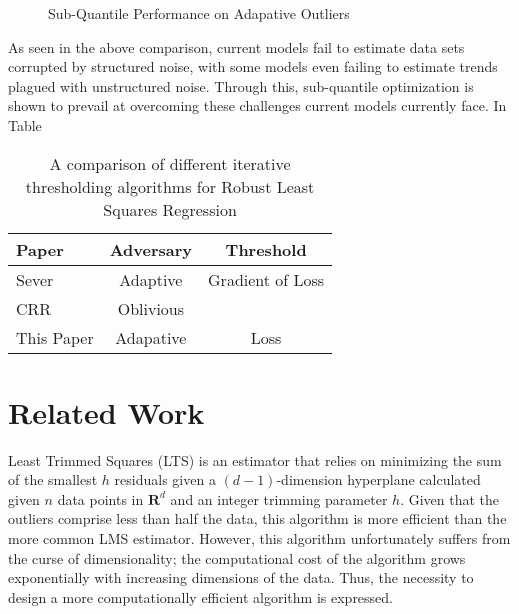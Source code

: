 \documentclass{article} %
\begin{document}
\begin{figure}[!t]
		\caption{Sub-Quantile Performance on Adapative Outliers}
		\label{fig:structure-unstructured-noise}
	\end{figure}
	
	As seen in the above comparison, current models fail to estimate data sets corrupted by structured noise, with some models even failing to estimate trends plagued with unstructured noise. Through this, sub-quantile optimization is shown to prevail at overcoming these challenges current models currently face. In Table 
	
	\begin{table}[!h]
		\centering
		\begin{tabular}{lcc}
			\toprule 
			Paper & Adversary & Threshold\\   
			\midrule                
			Sever \cite{DiakonikolasKKLSS19} & Adaptive & Gradient of Loss \\
			\midrule
			CRR \cite{bhatia2017} & Oblivious & \\
			\midrule 
			This Paper & Adapative & Loss\\
			\bottomrule
		\end{tabular}
		\caption{A comparison of different iterative thresholding algorithms for Robust Least Squares Regression}
		\label{tab:related-work}
	\end{table}
	
	\section{Related Work}
	Least Trimmed Squares (LTS) \cite{LTS} is an estimator that relies on minimizing the sum of the smallest $h$ residuals given a $(d-1)$-dimension hyperplane calculated given $n$ data points in $\mathbf{R}^d$ and an integer trimming parameter $h$. Given that the outliers comprise less than half the data, this algorithm is more efficient than the more common LMS estimator. However, this algorithm unfortunately suffers from the curse of dimensionality; the computational cost of the algorithm grows exponentially with increasing dimensions of the data. Thus, the necessity to design a more computationally efficient algorithm is expressed.
	
\end{document}
